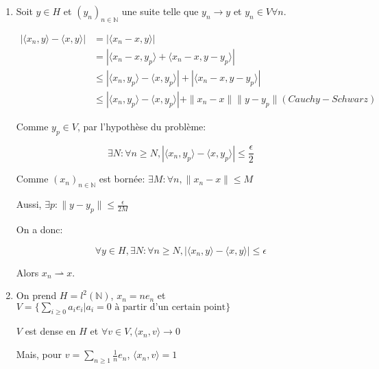 \documentclass[10pt,a4paper,oneside]{article}
\newenvironment{solution}[1][Solution]{\begin{trivlist}
\item[\hskip \labelsep {\bfseries #1}]}{\end{trivlist}}
\begin{document}
\begin{solution}

\begin{enumerate}

\item
Soit $y \in H$ et $(y_n)_{n \in \mathbb{N}}$ une suite telle que $y_n \rightarrow y$ et $y_n \in V \forall n$.

\begin{align}
| \langle x_n,y \rangle - \langle x,y \rangle | &= | \langle x_n - x,y \rangle | \nonumber \\
&= | \langle x_n - x,y_p \rangle + \langle x_n - x,y-y_p \rangle | \nonumber \\
&\leq | \langle x_n,y_p \rangle - \langle x,y_p \rangle | + | \langle x_n - x,y - y_p \rangle| \nonumber \\
&\leq  | \langle x_n,y_p \rangle - \langle x,y_p \rangle | + \| x_n - x \| \| y - y_p \| (Cauchy - Schwarz) \nonumber
\end{align}

Comme $y_p \in V$, par l'hypothèse du problème:

\[
\exists N: \forall n \geq N, | \langle x_n,y_p \rangle - \langle x,y_p \rangle | \leq \frac{\epsilon}{2}
\]

Comme $(x_n)_{n \in \mathbb{N}}$ est bornée: $\exists M: \forall n, \| x_n - x \| \leq M$

Aussi, $\exists p: \| y - y_p \| \leq \frac{\epsilon}{2M}$

On a donc:

\[
\forall y \in H, \exists N: \forall n \geq N, | \langle x_n,y \rangle - \langle x,y \rangle | \leq \epsilon
\]

Alors $x_n \rightharpoonup x$.


\item
On prend $H = l^2(\mathbb{N})$, $x_n = ne_n$ et $V = \{ \sum_{i\geq0}a_i e_i | a_i = 0 \text{ à partir d'un certain point} \}$

$V$ est dense en $H$ et $\forall v \in V, \langle x_n,v \rangle \rightarrow 0$

Mais, pour $v = \sum_{n \geq 1}\frac{1}{n}e_n$, $ \langle x_n,v \rangle = 1 $

\end{enumerate}

\end{solution}
\end{document}
